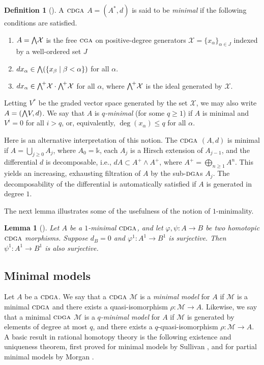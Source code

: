 \documentclass{article}
\numberwithin{equation}{section}
\newtheorem{lemma}[theorem]{Lemma}
\theoremstyle{definition}
\newtheorem{definition}[theorem]{Definition}
\renewcommand{\k}{\mathbb{k}}
\newcommand{\M}{\mathcal{M}}
\newcommand{\XX}{{\mathcal{X}}}
\newcommand{\dga}{\ensuremath{\textsc{dga}}}
\newcommand{\cga}{\ensuremath{\textsc{cga}}}
\newcommand{\cdga}{\ensuremath{\textsc{cdga}}}
\newcommand{\bwedge}{\mbox{\normalsize $\bigwedge$}}
\begin{document}
\begin{definition}[\cite{Sullivan77}]
\label{def:min-x}
A $\cdga$ $A=(A^{*},d)$ is said to be {\em minimal}\/  if 
the following conditions are satisfied.
\begin{enumerate}
\item \label{m1} 
$A=\bwedge \XX$ is the free $\cga$ on positive-degree 
generators $\XX=\{x_{\alpha}\}_{\alpha\in J}$ indexed by a well-ordered 
set $J$
\item \label{m2} 
$d x_{\alpha}\in \bwedge (\{x_{\beta} \mid \beta<\alpha\})$ for all $\alpha$.
\item  \label{m3} 
$d x_{\alpha}\in \bwedge^{\! +}\XX\cdot \bwedge^{\! +}\XX$ for all $\alpha$, 
where $\bwedge^{\! +}\XX$ is the ideal generated by $\XX$.
 \end{enumerate}
 \end{definition}
Letting $V^{*}$ be the graded vector space generated 
by the set $\XX$, we may also write $A=(\bwedge V, d)$. 
We say that $A$ is {\em $q$-minimal}\/ (for some $q\ge 1$) 
if $A$ is minimal and $V^i=0$ for all $i>q$, or, equivalently, 
$\deg(x_{\alpha})\le q$ for all $\alpha$.

Here is an alternative interpretation of this notion. The $\cdga$ 
$(A,d)$ is minimal if $A=\bigcup_{j\ge 0}A_j$, where 
$A_0=\k$, each $A_{j}$ is a Hirsch extension of $A_{j-1}$, 
and the differential $d$ is decomposable, i.e.,  
$dA\subset A^+\wedge A^+$, where $A^+=\bigoplus_{n\ge 1}A^{n }$.
This yields an increasing, exhausting filtration of $A$ by the sub-$\dga$s $A_j$. 
The decomposability of the differential is automatically satisfied if $A$ is 
generated in degree $1$.

The next lemma illustrates some of the usefulness of the notion 
of $1$-minimality.

\begin{lemma}[\cite{DeS18}]
\label{lem:surj}
Let $A$ be a $1$-minimal $\cdga$, and let $\varphi, \psi\colon A\to B$ 
be two homotopic $\cdga$ morphisms.  
Suppose $d_B=0$ and  $\varphi^1\colon A^1\to B^1$ is surjective.  
Then $\psi^1\colon A^1\to B^1$  is also surjective.  
\end{lemma}

\subsection{Minimal models}
\label{subsec:min-mod}
Let $A$ be a $\cdga$. We say that a $\cdga$ $\M$ is a {\em minimal model}\/ for $A$ 
if $\M$ is a minimal $\cdga$ and there exists a quasi-isomorphism $\rho\colon \M \to A$. 
Likewise, we say that a minimal $\cdga$ $\M$ is a {\em $q$-minimal model}\/ for 
$A$ if $\M$ is generated by elements of degree at most $q$, and there 
exists a $q$-quasi-isomorphism $\rho\colon \M \to A$. A basic result in 
rational homotopy theory is the following existence and uniqueness theorem, 
first proved for minimal models by Sullivan \cite{Sullivan77}, and for 
partial minimal models by Morgan \cite{Mo}. %
\end{document}
